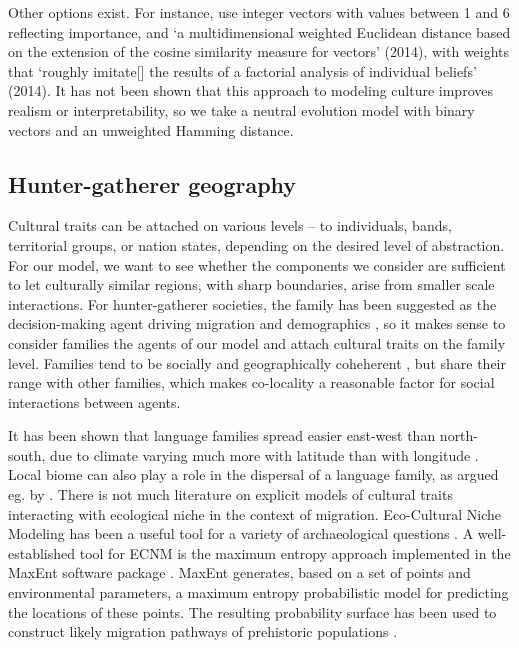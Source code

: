 \documentclass[a4paper,12pt]{scrartcl}
\begin{document}
Other options exist. For instance,
\textcite{barcelo2014social,barcelo2015simulating} use integer vectors with
values between 1 and 6 reflecting importance, and ‘a multidimensional weighted
Euclidean distance based on the extension of the cosine similarity measure for
vectors’ (2014), with weights that ‘roughly imitate[] the results of a factorial
analysis of individual beliefs’ (2014). It has not been shown that this approach
to modeling culture improves realism or interpretability, so we take a neutral
evolution model with binary vectors and an unweighted Hamming distance.

\subsection{Hunter-gatherer geography}
\label{s:geography}
Cultural traits can be attached on various levels – to individuals, bands,
territorial groups, or nation states, depending on the desired level of
abstraction. For our model, we want to see whether the components we consider
are sufficient to let culturally similar regions, with sharp boundaries, arise
from smaller scale interactions. For hunter-gatherer societies, the family has
been suggested as the decision-making agent driving migration and demographics
\parencite{}, so it makes sense to consider families the agents of our model and
attach cultural traits on the family level. Families tend to be socially and
geographically coheherent \textcite{}, but share their range with other
families, which makes co-locality a reasonable factor for social interactions
between agents.

It has been shown that language families spread easier east-west than
north-south, due to climate varying much more with latitude than with longitude
\parencite{}. Local biome can also play a role in the dispersal of a language
family, as argued eg. by \textcite{grollemund2015bantu,ehret2015bantu}. There is
not much literature on explicit models of cultural traits interacting with
ecological niche in the context of migration. Eco-Cultural Niche Modeling
\parencite[ECNM]{banks2006ecocultural} has been a useful tool for a variety of
archaeological questions
\cite{banks2008human,banks2013ecological,dalpoimguedes2014modeling,kondo2018ecological,walker2019persistence}.
A well-established tool for ECNM is the maximum entropy approach implemented in
the MaxEnt software package
\cite{phillips2006maximum,phillips2008modeling,maxenttutorial}. MaxEnt
generates, based on a set of points and environmental parameters, a maximum
entropy probabilistic model for predicting the locations of these points. The
resulting probability surface has been used to construct likely migration
pathways of prehistoric populations \cite{kondo2018ecological}.
\end{document}
